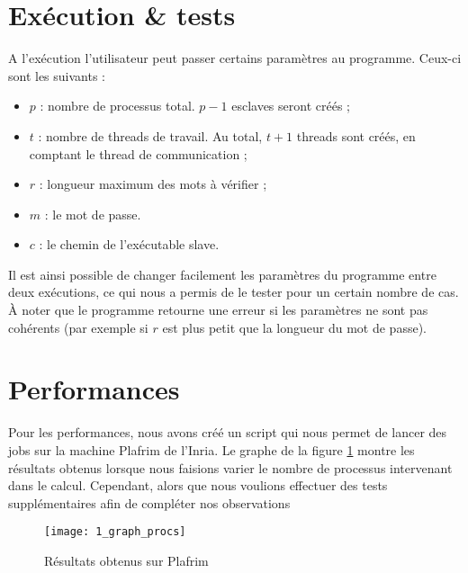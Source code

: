 \section{Exécution \& tests} %
\label{sec:execution}

A l'exécution l'utilisateur peut passer certains paramètres au programme. Ceux-ci sont les suivants :
\begin{itemize}
	\item $p$ : nombre de processus total. $p-1$ esclaves seront créés ;
	\item $t$ : nombre de threads de travail. Au total, $t+1$ threads sont créés, en comptant le thread de communication ;
	\item $r$ : longueur maximum des mots à vérifier ;
	\item $m$ : le mot de passe.
	\item $c$ : le chemin de l'exécutable \og slave\fg .
\end{itemize}

Il est ainsi possible de changer facilement les paramètres du programme entre deux exécutions, ce qui nous a permis de le tester pour un certain nombre de cas. \`A noter que le programme retourne une erreur si les paramètres ne sont pas cohérents (par exemple si $r$ est plus petit que la longueur du mot de passe).


\section{Performances} %
\label{sec:perf}

Pour les performances, nous avons créé un script qui nous permet de lancer des jobs sur la machine Plafrim de l'Inria. Le graphe de la figure \ref{fig:graph_procs} montre les résultats obtenus lorsque nous faisions varier le nombre de processus intervenant dans le calcul. Cependant, alors que nous voulions effectuer des tests supplémentaires afin de compléter nos observations

\begin{figure}[h!]
\centering
\texttt{[image: 1\_graph\_procs]}
\caption{Résultats obtenus sur Plafrim}
\label{fig:graph_procs}
\end{figure}

